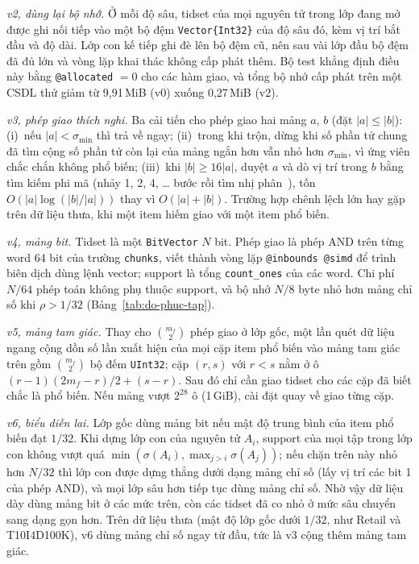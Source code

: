 \emph{v2, dùng lại bộ nhớ.} Ở mỗi độ sâu, tidset của mọi nguyên tử trong lớp đang mở được ghi nối tiếp vào một bộ đệm \texttt{Vector\{Int32\}} của độ sâu đó, kèm vị trí bắt đầu và độ dài. Lớp con kế tiếp ghi đè lên bộ đệm cũ, nên sau vài lớp đầu bộ đệm đã đủ lớn và vòng lặp khai thác không cấp phát thêm. Bộ test khẳng định điều này bằng \texttt{@allocated} $= 0$ cho các hàm giao, và tổng bộ nhớ cấp phát trên một CSDL thử giảm từ 9,91\,MiB (v0) xuống 0,27\,MiB (v2).

\emph{v3, phép giao thích nghi.} Ba cải tiến cho phép giao hai mảng $a$, $b$ (đặt $|a| \le |b|$): (i)~nếu $|a| < \sigma_{\min}$ thì trả về ngay; (ii)~trong khi trộn, dừng khi số phần tử chung đã tìm cộng số phần tử còn lại của mảng ngắn hơn vẫn nhỏ hơn $\sigma_{\min}$, vì ứng viên chắc chắn không phổ biến; (iii)~khi $|b| \ge 16|a|$, duyệt $a$ và dò vị trí trong $b$ bằng tìm kiếm phi mã (nhảy 1, 2, 4, \dots{} bước rồi tìm nhị phân~\cite{bentley1976almost}), tốn $O(|a| \log(|b|/|a|))$ thay vì $O(|a| + |b|)$. Trường hợp chênh lệch lớn hay gặp trên dữ liệu thưa, khi một item hiếm giao với một item phổ biến.

\emph{v4, mảng bit.} Tidset là một \texttt{BitVector} $N$ bit. Phép giao là phép AND trên từng word 64 bit của trường \texttt{chunks}, viết thành vòng lặp \texttt{@inbounds @simd} để trình biên dịch dùng lệnh vector; support là tổng \texttt{count\_ones} của các word. Chi phí $N/64$ phép toán không phụ thuộc support, và bộ nhớ $N/8$ byte nhỏ hơn mảng chỉ số khi $\rho > 1/32$ (Bảng~\ref{tab:do-phuc-tap}).

\emph{v5, mảng tam giác.} Thay cho $\binom{m_f}{2}$ phép giao ở lớp gốc, một lần quét dữ liệu ngang cộng dồn số lần xuất hiện của mọi cặp item phổ biến vào mảng tam giác trên gồm $\binom{m_f}{2}$ bộ đếm \texttt{UInt32}; cặp $(r, s)$ với $r < s$ nằm ở ô $(r-1)(2m_f - r)/2 + (s - r)$. Sau đó chỉ cần giao tidset cho các cặp đã biết chắc là phổ biến. Nếu mảng vượt $2^{28}$ ô (1\,GiB), cài đặt quay về giao từng cặp.

\emph{v6, biểu diễn lai.} Lớp gốc dùng mảng bit nếu mật độ trung bình của item phổ biến đạt $1/32$. Khi dựng lớp con của nguyên tử $A_i$, support của mọi tập trong lớp con không vượt quá $\min(\sigma(A_i), \max_{j > i} \sigma(A_j))$; nếu chặn trên này nhỏ hơn $N/32$ thì lớp con được dựng thẳng dưới dạng mảng chỉ số (lấy vị trí các bit 1 của phép AND), và mọi lớp sâu hơn tiếp tục dùng mảng chỉ số. Nhờ vậy dữ liệu dày dùng mảng bit ở các mức trên, còn các tidset đã co nhỏ ở mức sâu chuyển sang dạng gọn hơn. Trên dữ liệu thưa (mật độ lớp gốc dưới $1/32$, như Retail và T10I4D100K), v6 dùng mảng chỉ số ngay từ đầu, tức là v3 cộng thêm mảng tam giác.

